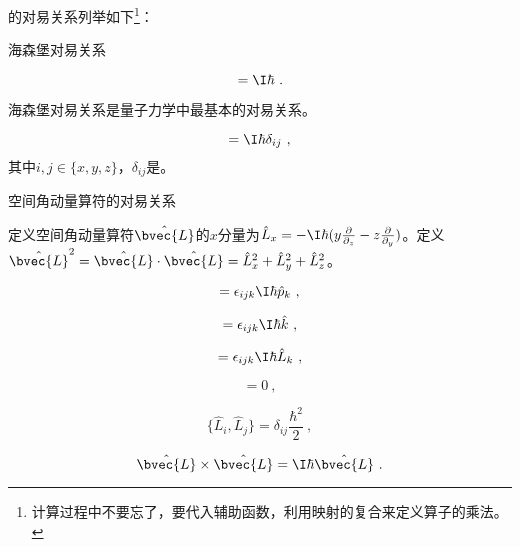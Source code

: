 的对易关系列举如下\footnote{计算过程中不要忘了，要代入辅助函数，利用映射的复合来定义算子的乘法。}：

\begin{theorem}{海森堡对易关系}\label{the_ComOpQ_5}

\begin{equation}
[\hat{x}, \hat{p}_x] = \I\hbar~.
\end{equation}

\end{theorem}



海森堡对易关系是量子力学中最基本的对易关系。



\begin{corollary}{}\label{cor_ComOpQ_1}

\begin{equation}
[\hat{i}, \hat{p}_j]=\I\hbar\delta_{ij}~,
\end{equation}
其中$i, j\in\{x, y, z\}$，$\delta_{ij}$是。
\end{corollary}

\begin{theorem}{空间角动量算符的对易关系}\label{the_ComOpQ_6}

定义空间角动量算符$\hat{\bvec{L}}$的$x$分量为$\hat{L}_x=-\I\hbar(y\frac{\partial}{\partial_z}-z\frac{\partial}{\partial _y})$。定义$\hat{\bvec{L}}^2=\hat{\bvec{L}}\cdot \hat{\bvec{L}}=\hat{L}_x^2+\hat{L}_y^2+\hat{L}_z^2$。


\begin{equation}
[\hat{p}_i, \hat{L}_j]=\epsilon_{ijk}\I\hbar\hat{p}_k~,
\end{equation}


\begin{equation}
[\hat{i}, \hat{L}_j]=\epsilon_{ijk}\I\hbar\hat{k}~,
\end{equation}



\begin{equation}
[\hat{L}_i, \hat{L}_j]=\epsilon_{ijk}\I\hbar\hat{L}_k~,
\end{equation}

\begin{equation}
[\hat{\bvec{L}}^2, \hat{L}_i]=0~,
\end{equation}

\begin{equation}
\{\hat{L}_i, \hat{L}_j\}=\delta_{ij}\frac{\hbar^2}{2}~,
\end{equation}

\begin{equation}
\hat{\bvec{L}}\times\hat{\bvec{L}}=\I\hbar \hat{\bvec{L}}~.
\end{equation}

\end{theorem}




